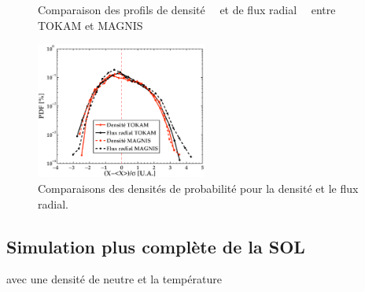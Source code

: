 \begin{refsection}
\begin{figure}[!htbp]
  \centering
    \caption{Comparaison des profils de
    densité~~ et de flux
    radial~~ entre TOKAM et MAGNIS}
    \label{pandas}
\end{figure}

\begin{figure}[!htbp]
\centering
\includegraphics[width=0.5\textwidth]{figures/4-TokamPDFDensite.eps}
{\caption{Comparaisons des densités de probabilité pour la densité et
le flux radial.}
\label{4-TokamPDFDensite}}
\end{figure}

\subsection{Simulation plus complète de la SOL}
 avec une densité de neutre et la température
%
%
	
\end{refsection}

